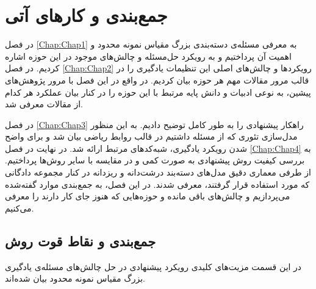 \chapter{جمع‌بندی و کارهای آتی}\label{Chap:Chap5}
\minitoc
\setcounter{footnote}{0}
\pagestyle{plain}

در فصل 
\ref{Chap:Chap1}
به معرفی مسئله‌ی دسته‌بندی بزرگ مقیاس نمونه محدود و اهمیت آن پرداختیم و به رویکرد حل‌مسئله و چالش‌های موجود در این حوزه  اشاره کردیم. در فصل 
 \ref{Chap:Chap2}
رویکرد‌ها و چالش‌های اصلی این تنظیمات یادگیری را در قالب مرور مقالات مهم هر حوزه بیان کردیم. در واقع در این فصل با مرور پژوهش‌های پیشین، به نوعی ادبیات و دانش پایه مرتبط با این حوزه را در کنار بیان عملکرد هر کدام از مقالات معرفی شد.

در فصل
\ref{Chap:Chap3}
راهکار پیشنهادی را به طور کامل توضیح دادیم. به این منظور مدل‌سازی تئوری که از مسئله داشتیم در قالب روابط ریاضی بیان شد و برای واضح شدن رویکرد یادگیری، شبه‌کدهای مرتبط ارائه شد. در نهایت در فصل 
\ref{Chap:Chap4}
به بررسی کیفیت روش پیشنهادی به صورت کمی و در مقایسه با سایر روش‌ها پرداختیم. از طرفی معماری دقیق مدل‌های دسته‌بند درشت‌دانه و ریز‌دانه در کنار مجموعه دادگانی که مورد استفاده قرار گرفتند، معرفی شدند. در این فصل، به جمع‌بندی موارد گفته‌شده می‌پردازیم و چالش‌های باقی مانده و حوزه‌هایی که هنوز جای کار دارند را معرفی می‌کنیم.

\section{جمع‌بندی و نقاط قوت روش}

در این قسمت مزیت‌های کلیدی رویکرد پیشنهادی در حل چالش‌های مسئله‌ی یادگیری بزرگ مقیاس نمونه محدود بیان شده‌اند.

